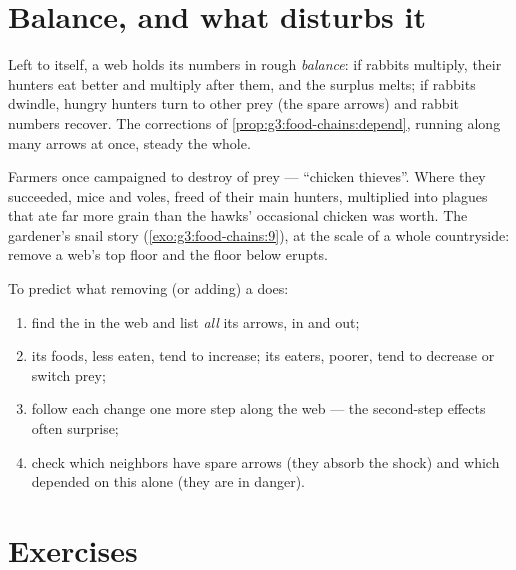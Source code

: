 \section{Balance, and what disturbs it}

\begin{proposition}\label{prop:g5:food-webs:balance}
Left to itself, a web holds its numbers in rough
\emph{balance}: if rabbits
multiply, their hunters eat better and multiply after them,
and the surplus melts; if rabbits dwindle, hungry hunters
turn to other prey (the spare arrows) and rabbit numbers
recover. The corrections of
\cref{prop:g3:food-chains:depend}, running along many
arrows at once, steady the whole.
\end{proposition}
\admitted

\begin{example}\label{ex:g5:food-webs:mistake}
Farmers once campaigned to destroy  of prey ---
``chicken thieves''. Where they succeeded, mice and voles,
freed of their main hunters, multiplied into plagues that
ate far more grain than the hawks' occasional chicken was
worth. The gardener's snail story
(\cref{exo:g3:food-chains:9}), at the scale of a whole
countryside: remove a web's top floor and the floor below
erupts.
\end{example}

\begin{method}\label{met:g5:food-webs:predict}
To predict what removing (or adding) a  does:
\begin{enumerate}
  \item find the  in the web and list \emph{all} its
        arrows, in and out;
  \item its foods, less eaten, tend to increase; its
        eaters, poorer, tend to decrease or switch prey;
  \item follow each change one more step along the web ---
        the second-step effects often surprise;
  \item check which neighbors have spare arrows (they
        absorb the shock) and which depended on this
         alone (they are in danger).
\end{enumerate}
\end{method}

\section{Exercises}

